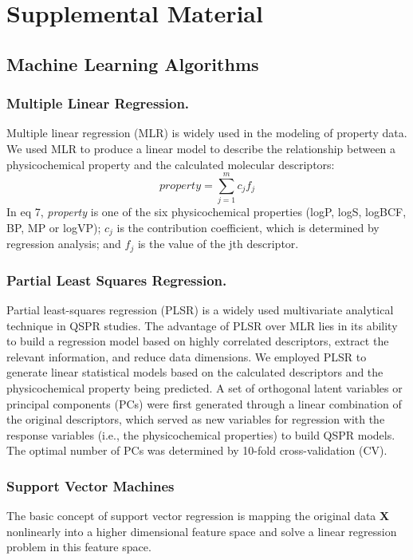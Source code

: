 \documentclass[10pt, letter]{article}
\renewcommand{\=}{\, =\, }
\newcommand{\+}{\, +\, }
\renewcommand{\-}{\, -\, }
\begin{document}
\newpage

\section{Supplemental Material}

\subsection{Machine Learning Algorithms}

\subsubsection{Multiple Linear Regression.} Multiple linear regression
(MLR) is widely used in the modeling of property data. We
used MLR to produce a linear model to describe the
relationship between a physicochemical property and the calculated
molecular descriptors:
\begin{equation}
property = \sum_{j = 1}^{m}c_{j}f_{j}
\end{equation}
In eq 7, \textit{property} is one of the six physicochemical properties
(logP, logS, logBCF, BP, MP or logVP); \(c_{j}\) is the contribution
coefficient, which is determined by regression analysis; and \(f_{j}\) is
the value of the jth descriptor. 

\subsubsection{Partial Least Squares Regression.} Partial least-squares
regression (PLSR) is a widely used multivariate analytical
technique in QSPR studies. The advantage of PLSR over
MLR lies in its ability to build a regression model based on
highly correlated descriptors, extract the relevant information,
and reduce data dimensions. We employed PLSR to generate
linear statistical models based on the calculated descriptors and the
physicochemical property being predicted. A set of orthogonal
latent variables or principal components (PCs) were first
generated through a linear combination of the original
descriptors, which served as new variables for
regression with the response variables (i.e., the physicochemical
properties) to build QSPR models. The optimal number of PCs
was determined by 10-fold cross-validation (CV).

\subsubsection{Support Vector Machines}
The basic concept of support vector regression is mapping the original data \textbf{X} nonlinearly into a higher dimensional feature space and solve a linear regression problem in this feature space.
\end{document}
